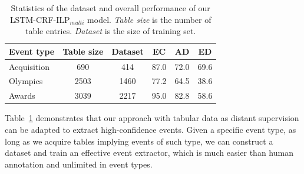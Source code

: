 \begin{table}[h]
\small
\centering
\begin{tabular}{|l|c|c|c|c|c|} \hline
	Event type & Table size & Dataset & EC & AD & ED \\ \hline
	Acquisition & 690 & 414 & 87.0 & 72.0 & 69.6 \\ \hline
	Olympics & 2503 & 1460 & 77.2 & 64.5 & 38.6 \\ \hline
	Awards & 3039 & 2217 & 95.0 & 82.8 & 58.6 \\ \hline
\end{tabular}
\caption{Statistics of the dataset and overall performance of our LSTM-CRF-ILP$_{multi}$ model. \textit{Table size} is the number of table entries. \textit{Dataset} is the size of training set. \label{tab:6}}
\end{table}

Table~\ref{tab:6} demonstrates that our approach with tabular data as distant supervision can be adapted to extract high-confidence events. Given a specific event type, as long as we acquire tables implying events of such type, we can construct a dataset and train an effective event extractor, which is much easier than human annotation and unlimited in event types. 
